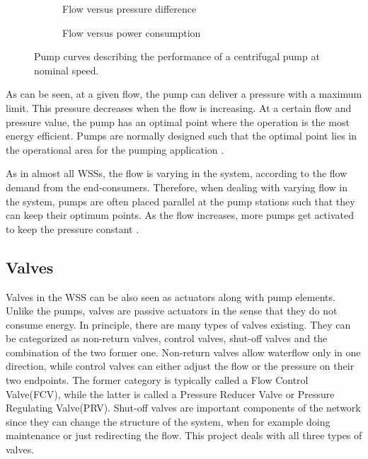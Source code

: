\begin{figure}[H]
\centering
\begin{subfigure}{.49\textwidth}
\centering
   
  \caption{Flow versus pressure difference}
  \label{fig:sub1}
\end{subfigure}
\begin{subfigure}{.49\textwidth}
\centering
   
  \caption{Flow versus power consumption}
  \label{fig:sub2}
\end{subfigure}
\caption{Pump curves describing the performance of a centrifugal pump at nominal speed.}
\label{fig:pump_curves}
\end{figure}

%  

\vspace{-3mm}

As can be seen, at a given flow, the pump can deliver a pressure with a maximum limit. This pressure decreases when the flow is increasing. At a certain flow and pressure value, the pump has an optimal point where the operation is the most energy efficient. Pumps are normally designed such that the optimal point lies in the operational area for the pumping application \cite{kenneth_houe}. 

As in almost all WSSs, the flow is varying in the system, according to the flow demand from the end-consumers. Therefore, when dealing with varying flow in the system, pumps are often placed parallel at the pump stations such that they can keep their optimum points. As the flow increases, more pumps get activated to keep the pressure constant \cite{kenneth_houe}. 

\subsection{Valves}
\label{valves}

Valves in the WSS can be also seen as actuators along with pump elements. Unlike the pumps, valves are passive actuators in the sense that they do not consume energy. In principle, there are many types of valves existing. They can be categorized as non-return valves, control valves, shut-off valves and the combination of the two former one. Non-return valves allow waterflow only in one direction, while control valves can either adjust the flow or the pressure on their two endpoints. The former category is typically called a Flow Control Valve(FCV), while the latter is called a Pressure Reducer Valve or Pressure Regulating Valve(PRV). Shut-off valves are important components of the network since they can change the structure of the system, when for example doing maintenance or just redirecting the flow. This project deals with all three types of valves. 


